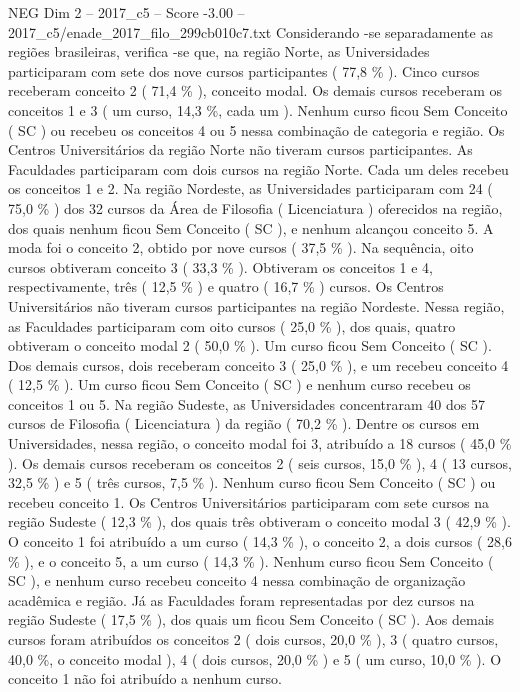 \begin{textsample}{NEG Dim 2 – 2017\_c5 – Score -3.00 – 2017\_c5/enade\_2017\_filo\_299cb010c7.txt}
Considerando -se separadamente as regiões brasileiras, verifica -se que, na região Norte, as Universidades participaram com sete dos nove cursos participantes ( 77,8 \% ).
Cinco cursos receberam conceito 2 ( 71,4 \% ), conceito modal.
Os demais cursos receberam os conceitos 1 e 3 ( um curso, 14,3 \%, cada um ).
Nenhum curso ficou Sem Conceito ( SC ) ou recebeu os conceitos 4 ou 5 nessa combinação de categoria e região.
Os Centros Universitários da região Norte não tiveram cursos participantes.
As Faculdades participaram com dois cursos na região Norte.
Cada um deles recebeu os conceitos 1 e 2.
Na região Nordeste, as Universidades participaram com 24 ( 75,0 \% ) dos 32 cursos da Área de Filosofia ( Licenciatura ) oferecidos na região, dos quais nenhum ficou Sem Conceito ( SC ), e nenhum alcançou conceito 5.
A moda foi o conceito 2, obtido por nove cursos ( 37,5 \% ).
Na sequência, oito cursos obtiveram conceito 3 ( 33,3 \% ).
Obtiveram os conceitos 1 e 4, respectivamente, três ( 12,5 \% ) e quatro ( 16,7 \% ) cursos.
Os Centros Universitários não tiveram cursos participantes na região Nordeste.
Nessa região, as Faculdades participaram com oito cursos ( 25,0 \% ), dos quais, quatro obtiveram o conceito modal 2 ( 50,0 \% ).
Um curso ficou Sem Conceito ( SC ).
Dos demais cursos, dois receberam conceito 3 ( 25,0 \% ), e um recebeu conceito 4 ( 12,5 \% ).
Um curso ficou Sem Conceito ( SC ) e nenhum curso recebeu os conceitos 1 ou 5.
Na região Sudeste, as Universidades concentraram 40 dos 57 cursos de Filosofia ( Licenciatura ) da região ( 70,2 \% ).
Dentre os cursos em Universidades, nessa região, o conceito modal foi 3, atribuído a 18 cursos ( 45,0 \% ).
Os demais cursos receberam os conceitos 2 ( seis cursos, 15,0 \% ), 4 ( 13 cursos, 32,5 \% ) e 5 ( três cursos, 7,5 \% ).
Nenhum curso ficou Sem Conceito ( SC ) ou recebeu conceito 1.
Os Centros Universitários participaram com sete cursos na região Sudeste ( 12,3 \% ), dos quais três obtiveram o conceito modal 3 ( 42,9 \% ).
O conceito 1 foi atribuído a um curso ( 14,3 \% ), o conceito 2, a dois cursos ( 28,6 \% ), e o conceito 5, a um curso ( 14,3 \% ).
Nenhum curso ficou Sem Conceito ( SC ), e nenhum curso recebeu conceito 4 nessa combinação de organização acadêmica e região.
Já as Faculdades foram representadas por dez cursos na região Sudeste ( 17,5 \% ), dos quais um ficou Sem Conceito ( SC ).
Aos demais cursos foram atribuídos os conceitos 2 ( dois cursos, 20,0 \% ), 3 ( quatro cursos, 40,0 \%, o conceito modal ), 4 ( dois cursos, 20,0 \% ) e 5 ( um curso, 10,0 \% ).
O conceito 1 não foi atribuído a nenhum curso.

\end{textsample}
